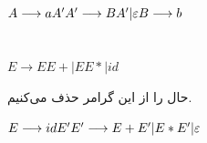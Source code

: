 \documentclass{article}
\begin{document}
\subsection{}
\begin{latin}
$
A \longrightarrow a A ^ \prime \\
A ^ \prime \longrightarrow B A ^ \prime | \varepsilon \\
B \longrightarrow b \\
$
\end{latin}



\section{}%
\begin{latin}
$
E \longrightarrow E E + | E E * | id
$
\end{latin}
حال  را از این گرامر حذف می‌کنیم.
\begin{latin}
$
E \longrightarrow id E ^ \prime \\
E ^ \prime \longrightarrow E + E ^ \prime | E * E ^ \prime | \varepsilon
$
\end{latin}



\end{document}
